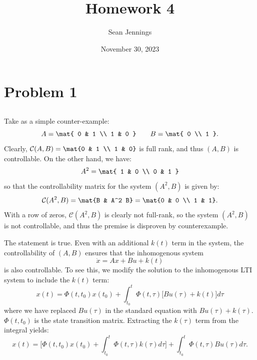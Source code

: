 \documentclass{homework}
\title{Homework 4}
\author{Sean Jennings}
\date{November 30, 2023}
\begin{document}
\maketitle

\section{Problem 1}
\subsection{}

\newcommand{\contr}{\mathcal{C}}

\begin{letterenum}
\item Take as a simple counter-example:
    \begin{equation*}
        A = \mat{
            0 & 1 \\
            1 & 0
        } \qquad B = \mat{
            0 \\ 1
        }.
    \end{equation*}
    Clearly, $\mathcal{C}(A, B) = \mat{0 & 1 \\ 1 & 0}$ is full rank, and
    thus $(A, B)$ is controllable. On the other hand, we have:
    \begin{equation*}
        A^2 = \mat{
            1 & 0 \\
            0 & 1
        }
    \end{equation*}
    so that the controllability matrix for the system $(A^2, B)$ is given by:
    \begin{equation*}
        \mathcal{C}(A^2, B) = \mat{B & A^2 B} = \mat{0 & 0 \\ 1 & 1}.
    \end{equation*}
    With a row of zeros, $\contr(A^2, B)$ is clearly not full-rank, so the system
    $(A^2, B)$ is not controllable, and thus the premise is disproven by
    counterexample.

\item The statement is true. Even with an additional $k(t)$ term in the system,
    the controllability of $(A, B)$ ensures that the inhomogenous system
    \begin{equation*}
        \dot{x} = Ax + Bu + k(t)
    \end{equation*}
    is also controllable. To see this, we modify the solution to the inhomogenous
    LTI system to include the $k(t)$ term:
    \begin{equation*}
        x(t) = \Phi(t, t_0) x(t_0) + \int_{t_0}^{t} \Phi(t, \tau) \bigl[
            B u(\tau) + k(t)
        \bigr] d\tau
    \end{equation*}
    where we have replaced $Bu(\tau)$ in the standard equation with
    $Bu(\tau) + k(\tau)$. $\Phi(t, t_0)$ is the state transition matrix.
    Extracting the $k(\tau)$ term from the integral yields:
    \begin{equation*}
        x(t) = \biggl[
            \Phi(t, t_0) x(t_0) + \int_{t_0}^t \Phi(t, \tau) k(\tau) d\tau
        \biggr] + \int_{t_0}^{t} \Phi(t, \tau) B u(\tau) d\tau.
    \end{equation*}


\end{letterenum}
\end{document}
